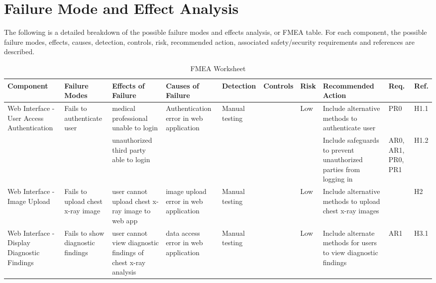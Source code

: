 \documentclass{article}
\begin{document}
\section{Failure Mode and Effect Analysis}
The following is a detailed breakdown of the possible failure modes and effects analysis, or FMEA table. For each component, the possible failure modes, effects, causes, detection, controls, risk, recommended action, associated safety/security requirements and references are described.

\begin{landscape}
\begin{table}[hp]
    \caption{FMEA Worksheet} \label{FMEA}
    \centering
    \begin{footnotesize}
    \begin{tabular}{|p{1in}|p{1in}|p{1in}|p{1.5in}|p{0.6in}|p{0.5in}|p{0.3in}|p{2.5in}|p{0.2in}|p{0.2in}|}
        \toprule
        \textbf{Component} & \textbf{Failure Modes} & \textbf{Effects of Failure} &\textbf{Causes of Failure} & \textbf{Detection} &\textbf{Controls} &\textbf{Risk} &\textbf{Recommended Action} &\textbf{Req.} &\textbf{Ref.} \\
        \bottomrule
        \multirow{2}{1in}{Web Interface - User Access Authentication} & \multirow{2}{1in}{Fails to authenticate user} & medical professional unable to login & \multirow{2}{1.5in}{Authentication error in web application} & \multirow{2}{0.6in}{Manual testing} & & \multirow{2}{0.3in}{Low} & Include alternative methods to authenticate user & PR0 & H1.1 \\
        \cline{3-3}\cline{8-10}
        & & unauthorized third party able to login & & & & & Include safeguards to prevent unauthorized parties from logging in & AR0, AR1, PR0, PR1 & H1.2 \\
        \hline
        Web Interface - Image Upload & Fails to upload chest x-ray image & user cannot upload chest x-ray image to web app & image upload error in web application & Manual testing & & Low & Include alternative methods to upload chest x-ray images & & H2 \\
        \hline
        \multirow{2}{1in}{Web Interface - Display Diagnostic Findings} & Fails to show diagnostic findings & user cannot view diagnostic findings of chest x-ray analysis & \multirow{2}{1.5in}{data access error in web application} & \multirow{2}{0.6in}{Manual testing} & & \multirow{2}{0.3in}{Low} & Include alternate methods for users to view diagnostic findings & AR1 & H3.1 \\

\end{tabular}
\end{footnotesize}
\end{table}
\end{landscape}
\end{document}
